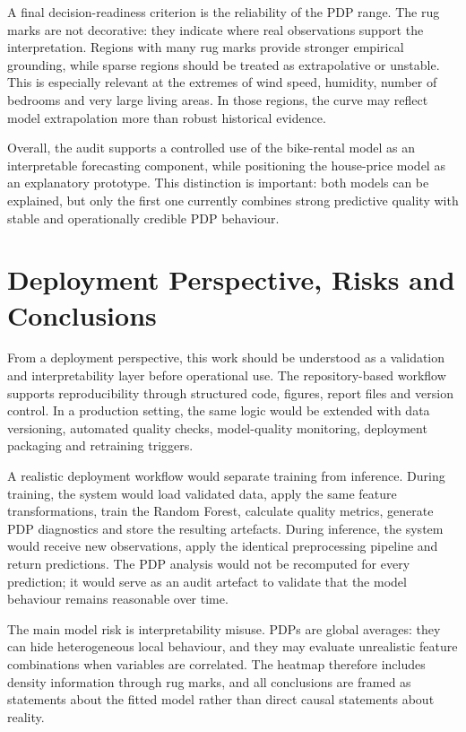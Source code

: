\documentclass[
]{article}
\begin{document}
A final decision-readiness criterion is the reliability of the PDP range. The rug marks are not decorative: they indicate where real observations support the interpretation. Regions with many rug marks provide stronger empirical grounding, while sparse regions should be treated as extrapolative or unstable. This is especially relevant at the extremes of wind speed, humidity, number of bedrooms and very large living areas. In those regions, the curve may reflect model extrapolation more than robust historical evidence.

Overall, the audit supports a controlled use of the bike-rental model as an interpretable forecasting component, while positioning the house-price model as an explanatory prototype. This distinction is important: both models can be explained, but only the first one currently combines strong predictive quality with stable and operationally credible PDP behaviour.

\section{Deployment Perspective, Risks and Conclusions}
\label{deployment-perspective-risks-and-conclusions}

From a deployment perspective, this work should be understood as a validation and interpretability layer before operational use. The repository-based workflow supports reproducibility through structured code, figures, report files and version control. In a production setting, the same logic would be extended with data versioning, automated quality checks, model-quality monitoring, deployment packaging and retraining triggers.

A realistic deployment workflow would separate training from inference. During training, the system would load validated data, apply the same feature transformations, train the Random Forest, calculate quality metrics, generate PDP diagnostics and store the resulting artefacts. During inference, the system would receive new observations, apply the identical preprocessing pipeline and return predictions. The PDP analysis would not be recomputed for every prediction; it would serve as an audit artefact to validate that the model behaviour remains reasonable over time.

The main model risk is interpretability misuse. PDPs are global averages: they can hide heterogeneous local behaviour, and they may evaluate unrealistic feature combinations when variables are correlated. The heatmap therefore includes density information through rug marks, and all conclusions are framed as statements about the fitted model rather than direct causal statements about reality.
\end{document}
